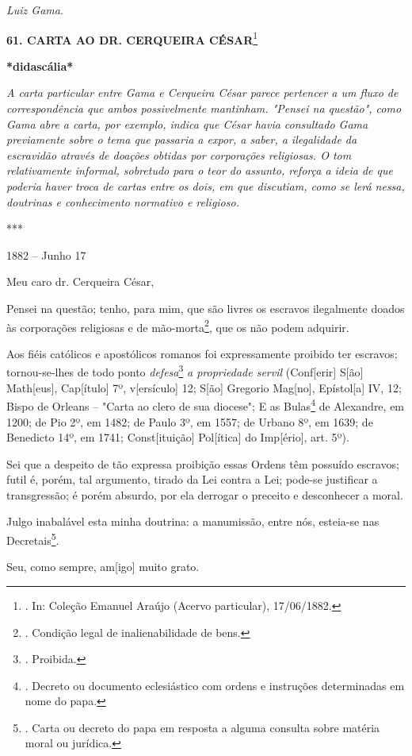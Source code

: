 \emph{Luiz Gama}.

\textbf{61. CARTA AO DR. CERQUEIRA CÉSAR}\footnote{. In: Coleção Emanuel
  Araújo (Acervo particular), 17/06/1882.}

\textbf{*didascália*}

\emph{A carta particular entre Gama e Cerqueira César parece pertencer a
um fluxo de correspondência que ambos possivelmente mantinham. "Pensei
na questão", como Gama abre a carta, por exemplo, indica que César havia
consultado Gama previamente sobre o tema que passaria a expor, a saber,
a ilegalidade da escravidão através de doações obtidas por corporações
religiosas. O tom relativamente informal, sobretudo para o teor do
assunto, reforça a ideia de que poderia haver troca de cartas entre os
dois, em que discutiam, como se lerá nessa, doutrinas e conhecimento
normativo e religioso. }

***

1882 -- Junho 17

Meu caro dr. Cerqueira César,

Pensei na questão; tenho, para mim, que são livres os escravos
ilegalmente doados às corporações religiosas e de mão-morta\footnote{.
  Condição legal de inalienabilidade de bens.}, que os não podem
adquirir.

Aos fiéis católicos e apostólicos romanos foi expressamente proibido ter
escravos; tornou-se-lhes de todo ponto \emph{defesa}\footnote{.
  Proibida.} \emph{a propriedade servil} (Conf{[}erir{]} S{[}ão{]}
Math{[}eus{]}, Cap{[}ítulo{]} 7º, v{[}ersículo{]} 12; S{[}ão{]} Gregorio
Mag{[}no{]}, Epístol{[}a{]} IV, 12; Bispo de Orleans -- "Carta ao clero
de sua diocese"; E as Bulas\footnote{. Decreto ou documento eclesiástico
  com ordens e instruções determinadas em nome do papa.} de Alexandre,
em 1200; de Pio 2º, em 1482; de Paulo 3º, em 1557; de Urbano 8º, em
1639; de Benedicto 14º, em 1741; Const{[}ituição{]} Pol{[}ítica{]} do
Imp{[}ério{]}, art. 5º).

Sei que a despeito de tão expressa proibição essas Ordens têm possuído
escravos; futil é, porém, tal argumento, tirado da Lei contra a Lei;
pode-se justificar a transgressão; é porém absurdo, por ela derrogar o
preceito e desconhecer a moral.

Julgo inabalável esta minha doutrina: a manumissão, entre nós, esteia-se
nas Decretais\footnote{. Carta ou decreto do papa em resposta a alguma
  consulta sobre matéria moral ou jurídica.}.

Seu, como sempre,
am{[}igo{]} muito grato.

